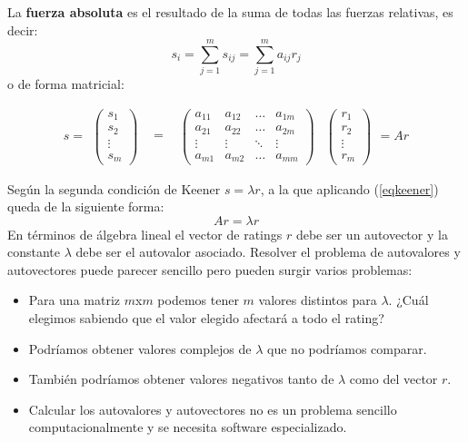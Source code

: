 \begin{defi} 
	La \textbf{fuerza absoluta} es el resultado de la suma de todas las fuerzas relativas, es decir: 
	\begin{equation}
		s_{i}=\sum_{j=1}^{m} s_{ij} = \sum_{j=1}^{m} a_{ij}r_{j} 
	\end{equation}
	o de forma matricial:
	
	\begin{equation}
		s=
		\begin{array}{ccccccc}
			\left(\begin{array}{c}
				s_{1}\\
				s_{2}\\
				\vdots\\
				s_{m}	
			\end{array}\right) & \begin{array}{c}
			=
		\end{array} & \left(\begin{array}{cccc}
		a_{11} & a_{12} & \dots & a_{1m}\\
		a_{21} & a_{22} & \dots & a_{2m} \\
		\vdots & \vdots & \ddots & \vdots\\
		a_{m1} & a_{m2} & \dots & a_{mm}
	\end{array} \right) & \left(\begin{array}{c}
	r_{1}\\
	r_{2}\\
	\vdots\\
	r_{m}
	\end{array} \right) 
	\end{array}  
	=Ar \label{eqkeener}
	\end{equation}
\end{defi}


	
Según la segunda condición de Keener $s= \lambda r$, a la que aplicando (\ref{eqkeener}) queda de la siguiente forma:
\begin{equation} \label{eqkeener2}
Ar= \lambda r
\end{equation}
En términos de álgebra lineal el vector de ratings $r$ debe ser un autovector y la constante $\lambda$ debe ser el autovalor asociado. Resolver el problema de autovalores y autovectores puede parecer sencillo pero pueden surgir varios problemas:
\begin{itemize}
	\item Para una matriz $m$x$m$ podemos tener $m$ valores distintos para $\lambda$. ¿Cuál elegimos sabiendo que el valor elegido afectará a todo el rating?
	\item Podríamos obtener valores complejos de $\lambda$ que no podríamos comparar.
	\item También podríamos obtener valores negativos tanto de $\lambda$ como del vector $r$.
	\item Calcular los autovalores y autovectores no es un problema sencillo computacionalmente y se necesita software especializado.
\end{itemize}

